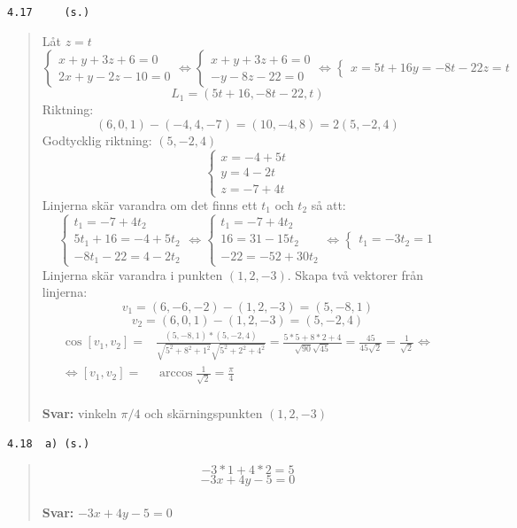 \documentclass[a4paper]{article}
\newcommand{\tskcol}[1]{\textcolor{tskcol}{#1}}
\begin{document}
\pagebreak
\texttt{\tskcol{4.17~~~~ (s.)}}
\begin{quotation}
	\noindent
	Låt $z=t$
	\[\begin{cases}
	x+y+3z+6=0 \\
	2x+y-2z-10=0
	\end{cases} \Leftrightarrow
	\begin{cases}
	x+y+3z+6=0 \\
	-y-8z-22=0
	\end{cases} \Leftrightarrow
	\begin{cases}
	x=5t+16
	y=-8t-22
	z=t
	\end{cases}\]
	\[L_1=(5t+16,-8t-22,t)\]
	Riktning:
	\[(6,0,1)-(-4,4,-7)=(10,-4,8)=2(5,-2,4)\]
	Godtycklig riktning: $(5,-2,4)$
	\[\begin{cases}
	x=-4+5t \\
	y=4-2t \\
	z=-7+4t
	\end{cases}\]
	Linjerna skär varandra om det finns ett $t_1$ och $t_2$ så att:
	\[\begin{cases}
	t_1 = -7+4t_2 \\
	5t_1+16 = -4+5t_2 \\
	-8t_1-22 = 4-2t_2
	\end{cases} \Leftrightarrow
	\begin{cases}
	t_1 = -7+4t_2 \\
	16 = 31-15t_2 \\
	-22 = -52+30t_2
	\end{cases} \Leftrightarrow
	\begin{cases}
	t_1=-3
	t_2=1
	\end{cases}\]
	Linjerna skär varandra i punkten $(1,2,-3)$.
	Skapa två vektorer från linjerna:
	\[v_1=(6,-6,-2)-(1,2,-3)=(5,-8,1)\]
	\[v_2=(6,0,1)-(1,2,-3)=(5,-2,4)\]
	\begin{align*}
	\cos[v_1,v_2]=&
	\frac{(5,-8,1)*(5,-2,4)}{\sqrt{5^2+8^2+1^2}\sqrt{5^2+2^2+4^2}}=
	\frac{5*5+8*2+4}{\sqrt{90}\sqrt{45}}=
	\frac{45}{45\sqrt{2}}=
	\frac{1}{\sqrt{2}} \Leftrightarrow \\ \Leftrightarrow
	[v_1,v_2]=&\arccos\frac{1}{\sqrt{2}}=\frac{\pi}{4}
	\end{align*}
	\\
	\textbf{Svar:} vinkeln $\pi/4$ och skärningspunkten $(1,2,-3)$
\end{quotation}

\texttt{\tskcol{4.18~~a) (s.)}}
\begin{quotation}
	\noindent
	\[-3*1+4*2=5\]
	\[-3x+4y-5=0\]
	\\
	\textbf{Svar:} $-3x+4y-5=0$
\end{quotation}
\end{document}
